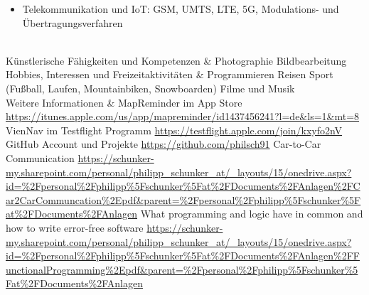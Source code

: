 \begin{longtabu}
\begin{itemize}[nosep,leftmargin=1em]
	\item Telekommunikation und IoT: GSM, UMTS, LTE, 5G, Modulations- und Übertragungsverfahren %
	\end{itemize} \\
	Künstlerische Fähigkeiten und Kompetenzen &
	\tabitem Photographie \newline
	\tabitem Bildbearbeitung \\ \bottomrule
	Hobbies, Interessen und Freizeitaktivitäten &
	\tabitem Programmieren \newline
	\tabitem Reisen \newline
	\tabitem Sport (Fußball, Laufen, Mountainbiken, Snowboarden) \newline
	\tabitem Filme und Musik \\ \bottomrule
	Weitere Informationen &
	MapReminder im App Store \newline
	\small{\url{https://itunes.apple.com/us/app/mapreminder/id1437456241?l=de&ls=1&mt=8}} \newline
	VienNav im Testflight Programm \newline
	\small{\url{https://testflight.apple.com/join/kxyfo2nV}} \newline
	GitHub Account und Projekte \newline
	\small{\url{https://github.com/philsch91}} \newline
	Car-to-Car Communication \newline
	\small{\url{https://schunker-my.sharepoint.com/personal/philipp_schunker_at/_layouts/15/onedrive.aspx?id=\%2Fpersonal\%2Fphilipp\%5Fschunker\%5Fat\%2FDocuments\%2FAnlagen\%2FCar2CarCommuncation\%2Epdf&parent=\%2Fpersonal\%2Fphilipp\%5Fschunker\%5Fat\%2FDocuments\%2FAnlagen}} \newline
	What programming and logic have in common and how to write error-free software \newline
	\small{\url{https://schunker-my.sharepoint.com/personal/philipp_schunker_at/_layouts/15/onedrive.aspx?id=\%2Fpersonal\%2Fphilipp\%5Fschunker\%5Fat\%2FDocuments\%2FAnlagen\%2FFunctionalProgramming\%2Epdf&parent=\%2Fpersonal\%2Fphilipp\%5Fschunker\%5Fat\%2FDocuments\%2FAnlagen}} \newline
\end{longtabu}
